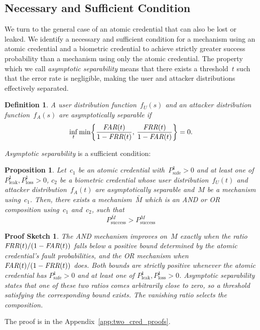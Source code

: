 \documentclass[conference,compsoc]{IEEEtran}
\newtheorem{proposition}{Proposition}
\newtheorem*{proofsketch}{Proof Sketch}
\newtheorem{definition}{Definition}
\begin{document}
\subsection{Necessary and Sufficient Condition}\label{sec:necessary_sufficient_success_condition}
\noindent 
We turn to the general case of an atomic credential that can also be lost or leaked. We identify a necessary and sufficient condition for a mechanism using an atomic credential and a biometric credential to achieve strictly greater success probability than a mechanism using only the atomic credential.
The property which we call \emph{asymptotic separability} means that there exists a threshold~$t$ such that the error rate is negligible, making the user and attacker distributions effectively separated.
\begin{definition}
A user distribution function~$f_U(s)$ and an attacker distribution function~$f_A(s)$ are \emph{asymptotically separable} if
\begin{equation*}
    \inf_{t}
    \min\!\left\{
    \frac{\textit{FAR}(t)}{1-\textit{FRR}(t)},\,
    \frac{\textit{FRR}(t)}{1-\textit{FAR}(t)}
    \right\}
    = 0.
\end{equation*}
\end{definition}
\emph{Asymptotic separability} is a sufficient condition:
\begin{proposition}\label{thm:suf_nec_cond_for_improve}
    Let~$c_1$ be an atomic credential with~$P^1_\text{safe} > 0$ and at least one of~$P^1_\text{leak},P^1_\text{loss} > 0$, $c_2$ be a biometric credential whose user distribution~$f_U(t)$ and attacker distribution~$f_A(t)$ are asymptotically separable and~$M$ be a mechanism using~$c_1$. Then, there exists a mechanism~$\bar{M}$ which is an \emph{AND} or \emph{OR} composition using~$c_1$ and~$c_2$, such that
    \begin{equation*}
        P_{\mathrm{success}}^{\bar{M}} > P_{\mathrm{success}}^{M}
    \end{equation*}
\end{proposition}
\noindent
\begin{proofsketch}
The \emph{AND} mechanism improves on~$M$ exactly when the ratio~$\textit{FRR}(t)/(1-\textit{FAR}(t))$ falls below a positive bound determined by the atomic credential’s fault probabilities, and the \emph{OR} mechanism when~$\textit{FAR}(t)/(1-\textit{FRR}(t))$ does.
Both bounds are strictly positive whenever the atomic credential has $P^1_\text{safe} > 0$ and at least one of $P^1_\text{leak}, P^1_\text{loss} > 0$.
Asymptotic separability states that one of these two ratios comes arbitrarily close to zero, so a threshold satisfying the corresponding bound exists. The vanishing ratio selects the composition.
\end{proofsketch}
\noindent
The proof is in the Appendix~\ref{app:two_cred_proofs}.
\end{document}
